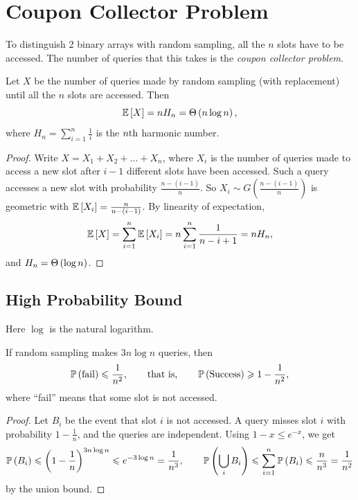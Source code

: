 \section{Coupon Collector Problem}

To distinguish 2 binary arrays with random sampling, all the $n$ slots have to be accessed. The
number of queries that this takes is the \emph{coupon collector problem}.

\begin{theorem}\label{thm:coupon}
    Let $X$ be the number of queries made by random sampling (with replacement) until all the
    $n$ slots are accessed. Then
    \[\expectation{X} = n H_n = \bigTh{n \log n},\]
    where $H_n = \sum_{i=1}^{n} \frac{1}{i}$ is the $n\text{th}$ harmonic number.
\end{theorem}

\begin{proof}
    Write $X = X_1 + X_2 + \dots + X_n$, where $X_i$ is the number of queries made to access a new
    slot after $i-1$ different slots have been accessed. Such a query accesses a new slot
    with probability $\frac{n-(i-1)}{n}$. So $X_i \sim G\left(\frac{n-(i-1)}{n}\right)$ is geometric
    with $\expectation{X_i} = \frac{n}{n-(i-1)}$. By linearity of expectation,
    \[\expectation{X} = \sum_{i=1}^{n} \expectation{X_i} = n \sum_{i=1}^{n} \frac{1}{n-i+1} = n H_n,\]
    and $H_n = \Theta\left(\log n\right)$.
\end{proof}

\subsection{High Probability Bound}

Here $\log$ is the natural logarithm.

\begin{theorem}\label{thm:whp}
    If random sampling makes $3 n \log n$ queries, then
    \[\prob{\text{fail}} \leq \frac{1}{n^2},
        \qquad\text{that is,}\qquad
        \prob{\text{Success}} \geq 1 - \frac{1}{n^2},\]
    where ``fail'' means that some slot is not accessed.
\end{theorem}

\begin{proof}
    Let $B_i$ be the event that slot $i$ is not accessed. A query misses slot $i$ with
    probability $1 - \frac{1}{n}$, and the queries are independent. Using $1 - x \leq e^{-x}$, we get
    \[\prob{B_i} \leq \left(1 - \frac{1}{n}\right)^{3 n \log n}
        \leq e^{-3 \log n} = \frac{1}{n^3},
        \qquad
        \prob{\bigcup_{i} B_i} \leq \sum_{i=1}^{n} \prob{B_i} \leq \frac{n}{n^3} = \frac{1}{n^2}\]
    by the union bound.
\end{proof}

